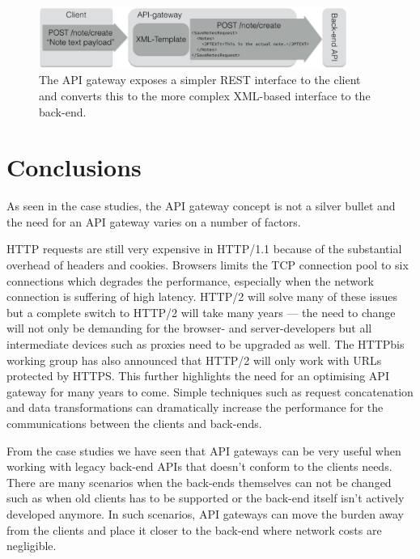 \documentclass{cslthse-msc}
\begin{document}
\begin{figure}[H]
  \centering
    \begin{center}
      \includegraphics[width=0.9\textwidth]{images/api_gateway_xml.png}
    \end{center}
  \caption{The API gateway exposes a simpler REST interface to the client and converts this to the more complex XML-based interface to the back-end.}
\end{figure}



\chapter{Conclusions}
As seen in the case studies, the API gateway concept is not a silver bullet and the need for an API gateway varies on a number of factors.

HTTP requests are still very expensive in HTTP/1.1 because of the substantial overhead of headers and cookies. Browsers limits the TCP connection pool to six connections which degrades the performance, especially when the network connection is suffering of high latency. HTTP/2 will solve many of these issues but a complete switch to HTTP/2 will take many years --- the need to change will not only be demanding for the browser- and server-developers but all intermediate devices such as proxies need to be upgraded as well. The HTTPbis working group has also announced that HTTP/2 will only work with URLs protected by HTTPS\cite{http2_ssl}. This further highlights the need for an optimising API gateway for many years to come. Simple techniques such as request concatenation and data transformations can dramatically increase the performance for the communications between the clients and back-ends.

From the case studies we have seen that API gateways can be very useful when working with legacy back-end APIs that doesn't conform to the clients needs. There are many scenarios when the back-ends themselves can not be changed such as when old clients has to be supported or the back-end itself isn't actively developed anymore. In such scenarios, API gateways can move the burden away from the clients and place it closer to the back-end where network costs are negligible. 
\end{document}
